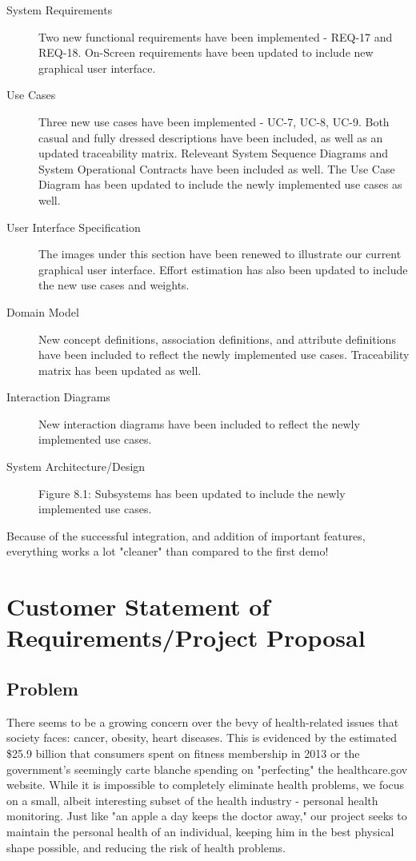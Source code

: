 \documentclass[letterpaper,english, 12pt]{scrreprt}
\begin{document}
\begin{description}
	\item[System Requirements] Two new functional requirements have been implemented - REQ-17 and REQ-18. On-Screen requirements have been updated to include new graphical user interface.
	\item[Use Cases] Three new use cases have been implemented - UC-7, UC-8, UC-9. Both casual and fully dressed descriptions have been included, as well as an updated traceability matrix. Releveant System Sequence Diagrams and System Operational Contracts have been included as well. The Use Case Diagram has been updated to include the newly implemented use cases as well.
	\item[User Interface Specification] The images under this section have been renewed to illustrate our current graphical user interface. Effort estimation has also been updated to include the new use cases and weights.
	\item[Domain Model] New concept definitions, association definitions, and attribute definitions have been included to reflect the newly implemented use cases. Traceability matrix has been updated as well.
	\item[Interaction Diagrams] New interaction diagrams have been included to reflect the newly implemented use cases.
	\item[System Architecture/Design] Figure 8.1: Subsystems has been updated to include the newly implemented use cases.
\end{description}
Because of the successful integration, and addition of important features, everything works a lot "cleaner" than compared to the first demo!








\chapter{Customer Statement of Requirements/Project Proposal}
 
\section{Problem}
There seems to be a growing concern over the bevy of health-related issues that society faces: cancer, obesity, heart diseases. This is evidenced by the estimated \$25.9 billion that consumers spent on fitness membership in 2013 or the government's seemingly carte blanche spending on "perfecting" the healthcare.gov website. While it is impossible to completely eliminate health problems, we focus on a small, albeit interesting subset of the health industry - personal health monitoring. Just like "an apple a day keeps the doctor away," our project seeks to maintain the personal health of an individual, keeping him in the best physical shape possible, and reducing the risk of health problems. \\
 
\end{document}
